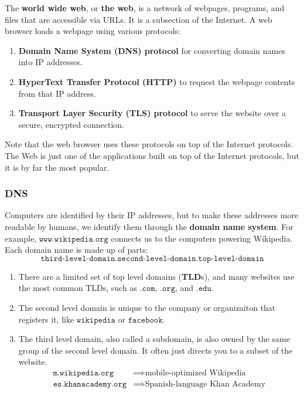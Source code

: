 \documentclass{article}
\begin{document}
  \begin{definition}
  The \textbf{world wide web}, or \textbf{the web}, is a network of webpages, programs, and files that are accessible via URLs. It is a subsection of the Internet. A web browser loads a webpage using various protocols: 
  \begin{enumerate}
      \item \textbf{Domain Name System (DNS) protocol} for converting domain names into IP addresses. 
      \item \textbf{HyperText Transfer Protocol (HTTP)} to request the webpage contents from that IP address. 
      \item \textbf{Transport Layer Security (TLS) protocol} to serve the website over a secure, encrypted connection. 
  \end{enumerate}
  Note that the web browser uses these protocols on top of the Internet protocols. The Web is just one of the applications built on top of the Internet protocols, but it is by far the most popular. 
  \end{definition}

  \subsubsection{DNS}
  \begin{definition}
  Computers are identified by their IP addresses, but to make these addresses more readable by humans, we identify them through the \textbf{domain name system}. For example, $\texttt{www.wikipedia.org}$ connects us to the computers powering Wikipedia. Each domain name is made up of parts: 
  \[\texttt{third-level-domain.second-level-domain.top-level-domain}\]
  \begin{enumerate}
      \item There are a limited set of top level domains (\textbf{TLD}s), and many websites use the most common TLDs, such as $\texttt{.com}$, $\texttt{.org}$, and $\texttt{.edu}$. 
      \item The second level domain is unique to the company or organizaiton that registers it, like $\texttt{wikipedia}$ or $\texttt{facebook}$. 
      \item The third level domain, also called a subdomain, is also owned by the same group of the second level domain. It often just directs you to a subset of the website. 
      \begin{align*}
          \texttt{m.wikipedia.org} & \implies \text{mobile-optimized Wikipedia} \\
          \texttt{es.khanacademy.org} & \implies \text{Spanish-language Khan Academy}
      \end{align*}
  \end{enumerate}
  \end{definition}
\end{document}
